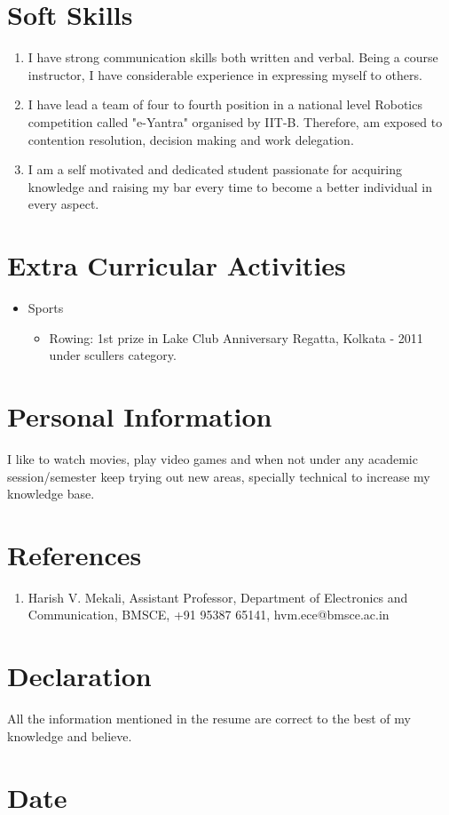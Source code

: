 \documentclass[11pt,a4paper,sans]{moderncv}        %
\begin{document}
\section{Soft Skills}
\begin{enumerate}
	\item I have strong communication skills both written and verbal.
	      Being a course instructor, I have considerable experience in expressing myself to others.
	\item I have lead a team of four to fourth position in a national level Robotics competition 
	      called "e-Yantra" organised by IIT-B. Therefore, am exposed to contention resolution, decision making
	      and work delegation.
	\item I am a self motivated and dedicated student passionate for acquiring knowledge and raising my bar every time     to become a better individual in every aspect.
\end{enumerate}

\section{Extra Curricular Activities}
\begin{itemize}
	\item Sports
	\begin{itemize}
		\item Rowing: 1st prize in Lake Club Anniversary Regatta, Kolkata - 2011 under scullers category.
	\end{itemize}
\end{itemize}
\section{Personal Information}
 I like to watch movies, play video games and when not under any academic session/semester keep trying out new areas, specially technical to increase my knowledge base.  
\section{References}
\begin{enumerate}
	\item Harish V. Mekali, Assistant Professor, Department of Electronics and Communication, BMSCE, +91 95387 65141,
	hvm.ece@bmsce.ac.in
\end{enumerate}

\section{Declaration}
All the information mentioned in the resume are correct to the best of my knowledge and believe.
\section{Date}
\date{}
\end{document}
